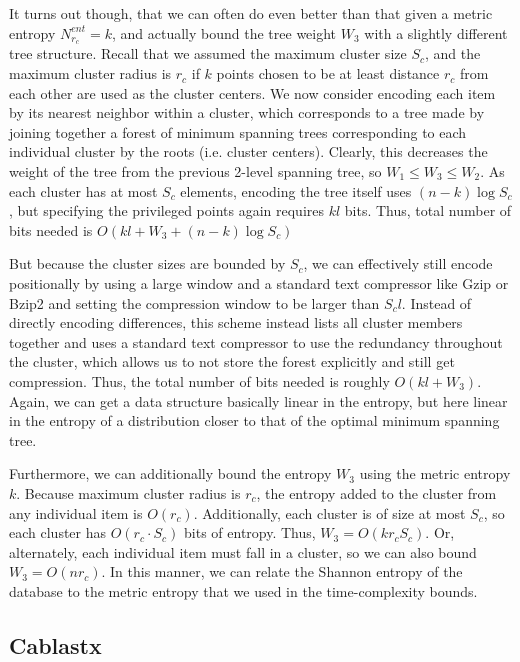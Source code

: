 \documentclass[review,preprint,12pt]{elsarticle}
\theoremstyle{definition}
\theoremstyle{remark}
\begin{document}
It turns out though, that we can often do even better than that given a metric entropy $N_{r_c}^{ent} = k$, and actually bound the tree weight $W_3$ with a slightly different tree structure.
Recall that we assumed the maximum cluster size $S_c$, and the maximum cluster radius is $r_c$ if $k$ points chosen to be at least distance $r_c$ from each other are used as the cluster centers.
We now consider encoding each item by its nearest neighbor within a cluster, which corresponds to a tree made by joining together a forest of minimum spanning trees corresponding to each individual cluster by the roots (i.e. cluster centers).
Clearly, this decreases the weight of the tree from the previous 2-level spanning tree, so $W_1 \le W_3 \le W_2$.
As each cluster has at most $S_c$ elements, encoding the tree itself uses $(n-k)\log S_c$, but specifying the privileged points again requires $kl$ bits.
Thus, total number of bits needed is $O(kl + W_3 + (n-k)\log S_c )$

But because the cluster sizes are bounded by $S_c$, we can effectively still encode positionally by using a large window and a standard text compressor like Gzip or Bzip2 and setting the compression window to be larger than $S_c l$.
Instead of directly encoding differences, this scheme instead lists all cluster members together and uses a standard text compressor to use the redundancy throughout the cluster, which allows us to not store the forest explicitly and still get compression.
Thus, the total number of bits needed is roughly $O(kl + W_3)$. Again, we can get a data structure basically linear in the entropy, but here linear in the entropy of a distribution closer to that of the optimal minimum spanning tree.

Furthermore, we can additionally bound the entropy $W_3$ using the metric entropy $k$.
Because maximum cluster radius is $r_c$, the entropy added to the cluster from any individual item is $O(r_c)$.
Additionally, each cluster is of size at most $S_c$, so each cluster has $O(r_c \cdot S_c)$ bits of entropy.
Thus, $W_3 = O(k r_c S_c)$.
Or, alternately, each individual item must fall in a cluster, so we can also bound $W_3 = O(n r_c)$.
In this manner, we can relate the Shannon entropy of the database to the metric entropy that we used in the time-complexity bounds.

\subsection{Cablastx}
\end{document}
